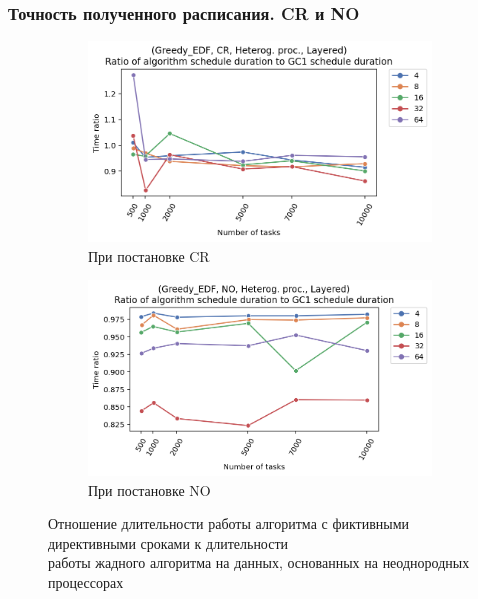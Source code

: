 \begin{frame}
    \frametitle{Точность полученного расписания. CR и NO}
    \begin{figure}
        \begin{subfigure}{0.49\textwidth}
            \includegraphics[width=\textwidth]{imgs/unbalanced/CR_EDF/gr_amalgamated.png}
            \caption{При постановке CR}
        \end{subfigure}
        \begin{subfigure}{0.49\textwidth}
            \includegraphics[width=\textwidth]{imgs/unbalanced/NO_EDF/gr_amalgamated.png}
            \caption{При постановке NO}
        \end{subfigure}
        \caption{Отношение длительности работы алгоритма с фиктивными директивными сроками к длительности\\работы жадного алгоритма на данных, основанных на неоднородных процессорах}
    \end{figure}
\end{frame}


